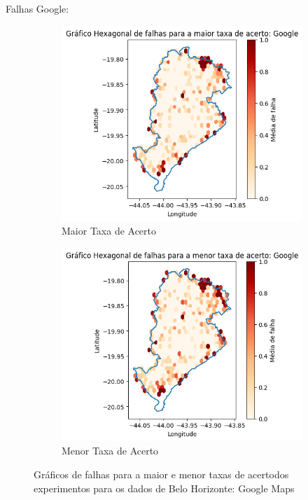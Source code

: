 Falhas Google:

\begin{figure}[ht]
  \centering
  \begin{subfigure}[b]{0.45\textwidth}
    \includegraphics[width=\textwidth]{Figuras/expFalhasGooglemaior.png}
    \caption{Maior Taxa de Acerto}
    \label{fig:falhasgoogleBHexpMaior}
  \end{subfigure}
  \hfill
  \begin{subfigure}[b]{0.45\textwidth}
    \includegraphics[width=\textwidth]{Figuras/expFalhasGooglemenor.png}
    \caption{Menor Taxa de Acerto}
    \label{fig:falhasgoogleBHexpMenor}
  \end{subfigure}
  
  \caption{Gráficos de falhas para a maior e menor taxas de acertodos experimentos para os dados de Belo Horizonte: Google Maps}
  \label{fig:falhas-exp-google}
\end{figure}


